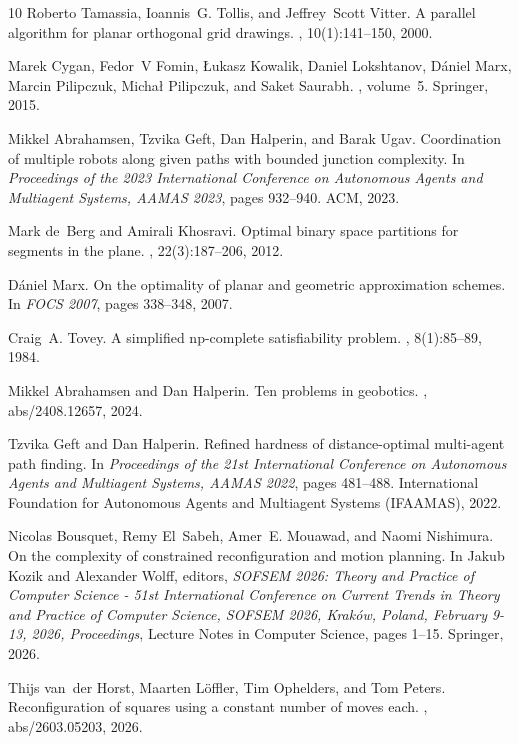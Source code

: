 \documentclass[a4paper,USenglish,thm-restate]{lipics-v2021}
\theoremstyle{problemstyle}
\begin{document}
\begin{thebibliography}{10}
Roberto Tamassia, Ioannis~G. Tollis, and Jeffrey~Scott Vitter.
\newblock A parallel algorithm for planar orthogonal grid drawings.
, 10(1):141--150, 2000.

Marek Cygan, Fedor~V Fomin, {\L}ukasz Kowalik, Daniel Lokshtanov, D{\'a}niel
  Marx, Marcin Pilipczuk, Micha{\l} Pilipczuk, and Saket Saurabh.
, volume~5.
\newblock Springer, 2015.

Mikkel Abrahamsen, Tzvika Geft, Dan Halperin, and Barak Ugav.
\newblock Coordination of multiple robots along given paths with bounded
  junction complexity.
\newblock In {\em Proceedings of the 2023 International Conference on
  Autonomous Agents and Multiagent Systems, {AAMAS} 2023}, pages 932--940.
  {ACM}, 2023.

Mark de~Berg and Amirali Khosravi.
\newblock Optimal binary space partitions for segments in the plane.
, 22(3):187--206, 2012.

D{\'a}niel Marx.
\newblock On the optimality of planar and geometric approximation schemes.
\newblock In {\em FOCS 2007}, pages 338--348, 2007.

Craig~A. Tovey.
\newblock A simplified np-complete satisfiability problem.
, 8(1):85--89, 1984.

Mikkel Abrahamsen and Dan Halperin.
\newblock Ten problems in geobotics.
, abs/2408.12657, 2024.

Tzvika Geft and Dan Halperin.
\newblock Refined hardness of distance-optimal multi-agent path finding.
\newblock In {\em Proceedings of the 21st International Conference on
  Autonomous Agents and Multiagent Systems, {AAMAS} 2022}, pages 481--488.
  International Foundation for Autonomous Agents and Multiagent Systems
  ({IFAAMAS}), 2022.

Nicolas Bousquet, Remy El~Sabeh, Amer~E. Mouawad, and Naomi Nishimura.
\newblock On the complexity of constrained reconfiguration and motion planning.
\newblock In Jakub Kozik and Alexander Wolff, editors, {\em {SOFSEM} 2026:
  Theory and Practice of Computer Science - 51st International Conference on
  Current Trends in Theory and Practice of Computer Science, {SOFSEM} 2026,
  Krak{\'{o}}w, Poland, February 9-13, 2026, Proceedings}, Lecture Notes in
  Computer Science, pages 1--15. Springer, 2026.

Thijs van~der Horst, Maarten L{\"o}ffler, Tim Ophelders, and Tom Peters.
\newblock Reconfiguration of squares using a constant number of moves each.
, abs/2603.05203, 2026.

\end{thebibliography}
\end{document}
